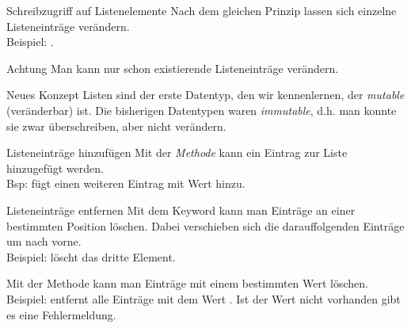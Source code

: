 \begin{frame}
\begin{block}{Schreibzugriff auf Listenelemente}
\vspace{2pt}
Nach dem gleichen Prinzip lassen sich einzelne Listeneinträge verändern. \\
Beispiel: . 
\end{block}

\pause 
\vspace{12pt}



\begin{alertblock}{Achtung}
\vspace{2pt}
Man kann nur schon existierende Listeneinträge verändern. 
\end{alertblock}

\pause 
\vspace{12pt}



\begin{exampleblock}{Neues Konzept}
\vspace{2pt}
Listen sind der erste Datentyp, den wir kennenlernen, der \emph{mutable} (veränderbar) ist. Die bisherigen Datentypen waren \emph{immutable}, d.h. man konnte sie zwar überschreiben, aber nicht verändern. 
\end{exampleblock}

\end{frame}

\begin{frame}
	
\begin{block}{Listeneinträge hinzufügen}
	\vspace{2pt}
	Mit der \emph{Methode}  kann ein Eintrag zur Liste hinzugefügt werden. \\ 
	Bsp:  fügt einen weiteren Eintrag mit Wert  hinzu. 
\end{block}	

\pause 
\vspace{12pt}


\begin{block}{Listeneinträge entfernen}
\vspace{2pt}
Mit dem Keyword  kann man Einträge an einer bestimmten Position löschen. Dabei verschieben sich die darauffolgenden Einträge um  nach vorne. \\
Beispiel:  löscht das dritte Element.  

\pause 

Mit der Methode  kann man Einträge mit einem bestimmten Wert löschen. \\
Beispiel:  entfernt alle Einträge mit dem Wert . Ist der Wert nicht vorhanden gibt es eine Fehlermeldung. 
\end{block}
\end{frame}

